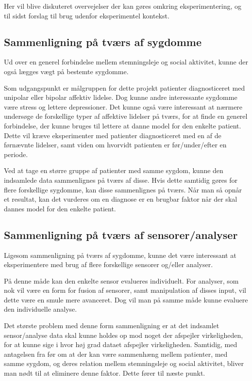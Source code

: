 Her vil blive diskuteret overvejelser der kan gøres omkring eksperimentering, og til sidst forslag til brug udenfor eksperimentel kontekst.

\subsection{Sammenligning på tværs af sygdomme}
Ud over en generel forbindelse mellem stemningsleje og social aktivitet, kunne der også lægges vægt på bestemte sygdomme.

Som udgangspunkt er målgruppen for dette projekt patienter diagnosticeret med unipolar eller bipolar affektiv lidelse.
Dog kunne andre interessante sygdomme være stress og lettere depressioner.
Det kunne også være interessant at nærmere undersøge de forskellige typer af affektive lidelser på tværs, for at finde en generel forbindelse, der kunne bruges til lettere at danne model for den enkelte patient.
Dette vil kræve eksperimenter med patienter diagnosticeret med en af de førnævnte lidelser, samt viden om hvorvidt patienten er før/under/efter en periode.

Ved at tage en større gruppe af patienter med samme sygdom, kunne den indsamlede data sammenlignes på tværs af disse.
Hvis dette samtidig gøres for flere forskellige sygdomme, kan disse sammenlignes på tværs.
Når man så opnår et resultat, kan det vurderes om en diagnose er en brugbar faktor når der skal dannes model for den enkelte patient.

\subsection{Sammenligning på tværs af sensorer/analyser}
Ligesom sammenligning på tværs af sygdomme, kunne det være interessant at eksperimentere med brug af flere forskellige sensorer og/eller analyser.

På denne måde kan den enkelte sensor evalueres individuelt.
For analyser, som nok vil være en form for fusion af sensorer, samt manipulation af disses input, vil dette være en smule mere avanceret.
Dog vil man på samme måde kunne evaluere den individuelle analyse.

Det største problem med denne form sammenligning er at det indsamlet sensor/analyse data skal kunne holdes op mod noget der afspejler virkeligheden, for at kunne sige i hvor høj grad dataet afspejler virkeligheden.
Samtidig, med antagelsen fra før om at der kan være sammenhæng mellem patienter, med samme sygdom, og deres relation mellem stemningsleje og social aktivitet, bliver man nødt til at eliminere denne faktor.
Dette fører til næste punkt.


